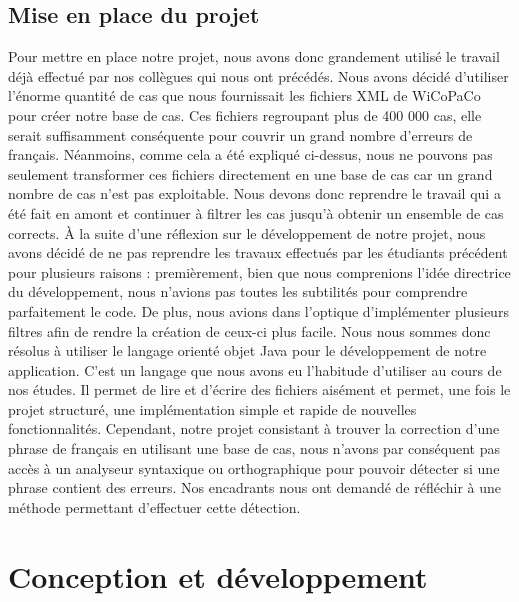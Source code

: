 \documentclass[11pt]{article}
\begin{document}
\subsection{Mise en place du projet}
Pour mettre en place notre projet, nous avons donc grandement utilis\'{e} le travail d\'{e}j\`{a} effectu\'{e} par nos coll\`{e}gues qui nous ont pr\'{e}c\'{e}d\'{e}s. Nous avons d\'{e}cid\'{e} d'utiliser l'\'{e}norme quantit\'{e} de cas que nous fournissait les fichiers XML de WiCoPaCo pour cr\'{e}er notre base de cas. Ces fichiers regroupant plus de 400 000 cas, elle serait suffisamment cons\'{e}quente pour couvrir un grand nombre d'erreurs de fran\c{c}ais. N\'{e}anmoins, comme cela a \'{e}t\'{e} expliqu\'{e} ci-dessus, nous ne pouvons pas seulement transformer ces fichiers directement en une base de cas car un grand nombre de cas n'est pas exploitable. Nous devons donc reprendre le travail qui a \'{e}t\'{e} fait en amont et continuer \`{a} filtrer les cas jusqu'\`{a} obtenir un ensemble de cas corrects.
\newline
\newline
\`{A} la suite d'une r\'{e}flexion sur le d\'{e}veloppement de notre projet, nous avons d\'{e}cid\'{e} de ne pas reprendre les travaux effectu\'{e}s par les \'{e}tudiants pr\'{e}c\'{e}dent pour plusieurs raisons : premi\`{e}rement, bien que nous comprenions l'id\'{e}e directrice du d\'{e}veloppement, nous n'avions pas toutes les subtilit\'{e}s pour comprendre parfaitement le code. De plus, nous avions dans l'optique d'impl\'{e}menter plusieurs filtres afin de rendre la cr\'{e}ation de ceux-ci plus facile. Nous nous sommes donc r\'{e}solus \`{a} utiliser le langage orient\'{e} objet Java pour le d\'{e}veloppement de notre application. C'est un langage que nous avons eu l'habitude d'utiliser au cours de nos \'{e}tudes. Il permet de lire et d'\'{e}crire des fichiers ais\'{e}ment et permet, une fois le projet structur\'{e}, une impl\'{e}mentation simple et rapide de nouvelles fonctionnalit\'{e}s.
\newline
\newline
Cependant, notre projet consistant \`{a} trouver la correction d'une phrase de fran\c{c}ais en utilisant une base de cas, nous n'avons par cons\'{e}quent pas acc\`{e}s \`{a} un analyseur syntaxique ou orthographique pour pouvoir d\'{e}tecter si une phrase contient des erreurs. Nos encadrants nous ont demand\'{e} de r\'{e}fl\'{e}chir \`{a} une m\'{e}thode permettant d'effectuer cette d\'{e}tection.


\section{Conception et d\'{e}veloppement}
\end{document}

